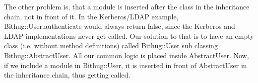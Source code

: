 \documentclass{llncs}
\begin{document}
The other problem is, that a module is inserted after the class in the inheritance chain, not in front of it. In the Kerberos/LDAP
example, Bithug::User.authenticate would always return false, since the Kerberos and LDAP implementations never get called. Our
solution to that is to have an empty class (i.e. without method definitions) called Bithug::User sub classing Bithug::AbstractUser.
All our common logic is placed inside AbstractUser. Now, if we include a module in Bithug::User, it is inserted in front of AbstractUser
in the inheritance chain, thus getting called.



\clearpage
\end{document}
